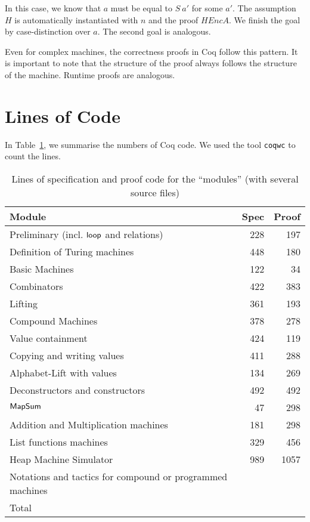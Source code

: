 In this case, we know that $a$ must be equal to $S~a'$ for some $a'$.  The assumption $H$ is automatically instantiated with $n$ and the proof
$HEncA$.  We finish the goal by case-distinction over $a$.  The second goal is analogous.


Even for complex machines, the correctness proofs in Coq follow this pattern.  It is important to note that the structure of the proof always follows
the structure of the machine.  Runtime proofs are analogous.


\section*{Lines of Code}
\label{sec:coq-lines}

In Table~\ref{tab:coq-lines}, we summarise the numbers of Coq code.  We used the tool \texttt{coqwc} to count the lines.%
\begin{table}[h]
  \centering
  \begin{tabular}{p{6.5cm}|r|r}
    Module                                    & Spec & Proof\\ \hline
    Preliminary (incl. $\mathsf{loop}$ and relations) &  228 &  197 \\
    Definition of Turing machines             &  448 &  180 \\
    Basic Machines                            &  122 &   34 \\
    Combinators                               &  422 &  383 \\
    Lifting                                   &  361 &  193 \\
    Compound Machines                         &  378 &  278 \\
    Value containment                         &  424 &  119 \\
    Copying and writing values                &  411 &  288 \\
    Alphabet-Lift with values                 &  134 &  269 \\
    Deconstructors and constructors           &  492 &  492 \\
    $\mathsf{MapSum}$                             &   47 &  298 \\
    Addition and Multiplication machines      &  181 &  298 \\
    List functions machines                   &  329 &  456 \\
    Heap Machine Simulator                    &  989 & 1057 \\
    Notations and tactics for compound
    or programmed machines                    &      &      \\  \hline\hline
    Total                                     &      &      \\
  \end{tabular}
  \caption{Lines of specification and proof code for the ``modules'' (with several source files)}
  \label{tab:coq-lines}
\end{table}


